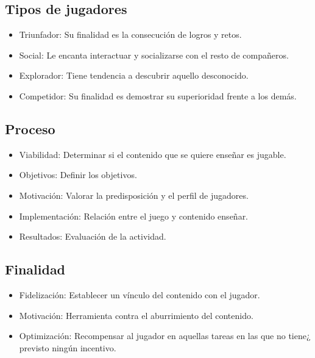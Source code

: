 \subsection{Tipos de jugadores}
\begin{itemize}
	\item Triunfador: Su finalidad es la consecución de logros y retos.
	\item Social: Le encanta interactuar y socializarse con el resto de compañeros.
	\item Explorador: Tiene tendencia a descubrir aquello desconocido.
	\item Competidor: Su finalidad es demostrar su superioridad frente a los demás.
\end{itemize}

\subsection{Proceso}
\begin{itemize}
	\item Viabilidad: Determinar si el contenido que se quiere enseñar es jugable.
	\item Objetivos: Definir los objetivos.
	\item Motivación: Valorar la predisposición y el perfil de jugadores.
	\item Implementación: Relación entre el juego y contenido enseñar.
	\item Resultados: Evaluación de la actividad.
\end{itemize}

\subsection{Finalidad}
\begin{itemize}
	\item Fidelización: Establecer un vínculo del contenido con el jugador.
	\item Motivación: Herramienta contra el aburrimiento del contenido.
	\item Optimización: Recompensar al jugador en aquellas tareas en las que no tiene¿ previsto ningún incentivo.
\end{itemize}